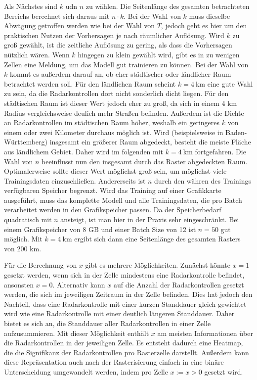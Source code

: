 Als Nächstes sind $k$ udn $n$ zu wählen.
Die Seitenlänge des gesamten betrachteten Bereichs berechnet sich daraus mit $n \cdot k$.
Bei der Wahl von $k$ muss dieselbe Abwägung getroffen werden wie bei der Wahl von $T$, jedoch geht es hier um den praktischen Nutzen der Vorhersagen je nach räumlicher Auflösung.
Wird $k$ zu groß gewählt, ist die zeitliche Auflösung zu gering, als dass die Vorhersagen nützlich wären.
Wenn $k$ hingegen zu klein gewählt wird, gibt es in zu wenigen Zellen eine Meldung, um das Modell gut trainieren zu können.
Bei der Wahl von $k$ kommt es außerdem darauf an, ob eher städtischer oder ländlicher Raum betrachtet werden soll.
Für den ländlichen Raum scheint $k = 4~\text{km}$ eine gute Wahl zu sein, da die Radarkontrollen dort nicht sonderlich dicht liegen.
Für den städtischen Raum ist dieser Wert jedoch eher zu groß, da sich in einem 4 km Radius vergleichsweise deulich mehr Straßen befinden.
Außerdem ist die Dichte an Radarkontrollen im städtischen Raum höher, weshalb ein geringeres $k$ von einem oder zwei Kilometer durchaus möglich ist.
Wird (beispielsweise in Baden-Württemberg) insgesamt ein größerer Raum abgedeckt, besteht die meiste Fläche aus ländlichem Gebiet.
Daher wird im folgenden mit $k = 4~\text{km}$ fortgefahren.
Die Wahl von $n$ beeinflusst nun den insgesamt durch das Raster abgedeckten Raum.
Optimalerweise sollte dieser Wert möglichst groß sein, um möglichst viele Trainingsdaten einzuschließen.
Andererseits ist $n$ durch den währen des Trainings verfügbaren Speicher begrenzt.
Wird das Training auf einer Grafikkarte ausgeführt, muss das komplette Modell und alle Trainingsdaten, die pro Batch verarbeitet werden in den Grafikspeicher passen.
Da der Speicherbedarf quadratisch mit $n$ ansteigt, ist man hier in der Praxis sehr eingeschränkt.
Bei einem Grafikspeicher von 8 GB und einer Batch Size von 12 ist $n = 50$ gut möglich.
Mit $k = 4~\text{km}$ ergibt sich dann eine Seitenlänge des gesamten Rasters von 200 km.

Für die Berechnung von $x$ gibt es mehrere Möglichkeiten.
Zunächst könnte $x = 1$ gesetzt werden, wenn sich in der Zelle mindestens eine Radarkontrolle befindet, ansonsten $x = 0$.
Alternativ kann $x$ auf die Anzahl der Radarkontrollen gesetzt werden, die sich im jeweiligen Zeitraum in der Zelle befinden.
Dies hat jedoch den Nachteil, dass eine Radarkontrolle mit einer kurzen Standdauer gleich gewichtet wird wie eine Radarkontrolle mit einer deutlich längeren Standdauer.
Daher bietet es sich an, die Standdauer aller Radarkontrollen in einer Zelle aufzusummieren.
Mit dieser Möglichkeit enthält $x$ am meisten Informationen über die Radarkontrollen in der jeweiligen Zelle.
Es entsteht dadurch eine Heatmap, die die Signifikanz der Radarkontrollen pro Rasterzelle darstellt.
Außerdem kann diese Repräsentation auch nach der Rasterisierung einfach in eine binäre Unterscheidung umgewandelt werden, indem pro Zelle $x := x > 0$ gesetzt wird.


